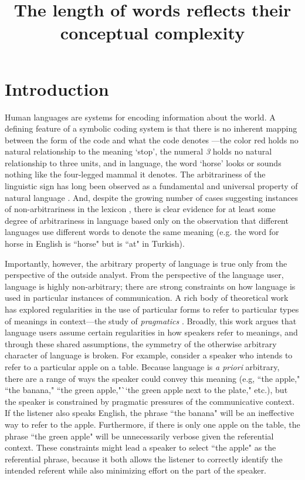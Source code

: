 \documentclass[man]{apa2}
\title{The length of words reflects their conceptual complexity}
\begin{document}
\maketitle                            


\section{Introduction}

Human languages are systems for encoding information about the world. A defining feature of a symbolic coding system is that there is no inherent mapping between the form of the code and what the code denotes  \cite{peirce}---the color red holds no natural relationship to the meaning `stop', the numeral {\it 3} holds no natural relationship to three units, and in language, the word `horse' looks or sounds nothing like the four-legged mammal it denotes.  The arbitrariness of the linguistic sign has long been observed as a fundamental and universal property of natural language \cite{saussure, hockett1960}. And, despite the growing number of cases suggesting instances of non-arbitrariness in the lexicon \cite<for a review,>{schmidtke2014phonological}, there is clear evidence for at least some degree of arbitrariness in language based only on the observation that different languages use different words to denote the same meaning  (e.g. the word for horse in English is ``horse" but is ``at" in Turkish). 


Importantly, however, the arbitrary property of language is true only from the perspective of the outside analyst. From the perspective of the language user, language is highly non-arbitrary; there are strong constraints on how language is used in particular instances of communication.  A rich body of theoretical work has explored regularities in the use of  particular forms to refer to particular  types of meanings in context---the study of {\it pragmatics} \cite{grice1975logic,horn1984, clark1996using}. Broadly, this work argues that  language users assume certain regularities in how speakers refer to meanings, and through these shared assumptions, the symmetry of the otherwise arbitrary character of language is broken. For example, consider a speaker who intends to refer to a particular apple on a table. Because language is {\it a priori} arbitrary, there are a range of  ways the speaker could convey this meaning (e.g, ``the apple," ``the banana," ``the green apple,"``the green apple next to the plate," etc.), but the speaker is constrained by pragmatic pressures of the communicative context. If the listener also speaks English, the phrase ``the banana" will be an  ineffective way to refer to the apple. Furthermore, if there is only one apple on the table, the phrase ``the green apple" will be unnecessarily verbose given the referential context. These constraints might lead a speaker to select ``the apple" as the referential phrase, because it both allows the listener to correctly identify the intended referent while also minimizing effort on the part of the speaker. 
\end{document}
